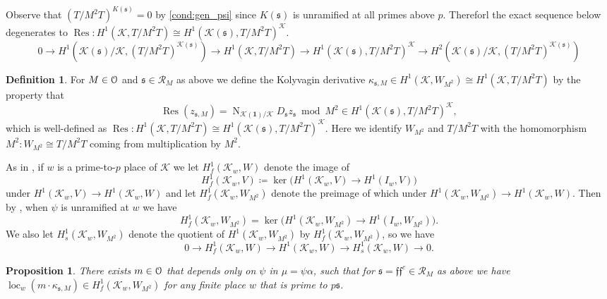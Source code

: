 \documentclass[leqno]{amsart}
\newtheorem{prop}[thm]{Proposition}
\theoremstyle{definition}
\newtheorem{defn}[thm]{Definition}
\theoremstyle{remark}
\newcommand{\id}{\mathbf{1}}
\newcommand{\eo}{\EuScript{O}}
\DeclareMathOperator{\Nr}{N}
\DeclareMathOperator{\Res}{Res}
\newcommand{\ff}{\mathfrak{f}}
\newcommand{\fs}{\mathfrak{s}}
\newcommand{\K}{{\mathcal{K}}} %
\DeclareMathOperator{\loc}{loc}
\begin{document}
Observe that $(T/{M^2}T)^{K(\fs)}=0$ by \eqref{cond:gen_psi}
since $K(\fs)$ is unramified at all primes above $p$. 
Thereforl the exact sequence below degenerates to 
$\Res\colon H^1(\K, T/{M^2}T)\cong H^1(\K(\fs), T/{M^2}T)^{\K}$.
\[
	0\to H^1(\K(\fs)/\K, (T/{M^2}T)^{\K(\fs)})\to
	H^1(\K, T/{M^2}T)\to
	H^1(\K(\fs), T/{M^2}T)^{\K}\to
	H^2(\K(\fs)/\K, (T/{M^2}T)^{\K(\fs)})
\]

\begin{defn}
For $M\in \eo$ and $\fs\in\mathcal{R}_M$ as above
we define the Kolyvagin derivative 
$\kappa_{\fs,M}\in H^1(\K,W_{M^2})\cong H^1(\K,T/{M^2}T)$
by the property that 
\[
    \Res(z_{\fs,M})=\Nr_{\K(\id)/\K}D_{\fs}z_{\fs} \bmod M^2\in 
    H^1(\K(\fs), T/{M^2}T)^{\K},
\]
which is well-defined as
$\Res\colon H^1(\K, T/{M^2}T)\cong H^1(\K(\fs), T/{M^2}T)^{\K}$.
Here we identify $W_{M^2}$ and $T/M^2T$ 
with the homomorphism $M^2\colon W_{M^2}\cong T/M^2T$
coming from multiplication by $M^2$.
\end{defn}


As in \cite[Def 1.3.4]{Rubin},
if $w$ is a prime-to-$p$ place of $\K$
we let $H^1_f(\K_w,W)$
denote the image of 
\[
    H^1_f(\K_w,V)\coloneqq
    \ker\big(H^1(\K_w,V)\to H^1(I_w, V)\big)
\]
under $H^1(\K_w,V)\to H^1(\K_w, W)$
and let $H^1_f(\K_w,W_{M^2})$ denote the preimage of which
under $H^1(\K_w,W_{M^2})\to H^1(\K_w, W)$. 
Then by \cite[Lem 1.3.8]{Rubin},
when $\psi$ is unramified at $w$ we have
\begin{equation}\label{eq:f_un}
    H^1_f(\K_w,W_{M^2})=
    \ker\big(H^1(\K_w,W_{M^2})\to H^1(I_w, W_{M^2})\big).
\end{equation}
We also let $H^1_s(\K_w,W_{M^2})$
denote the quotient of $H^1(\K_w,W_{M^2})$ by $H^1_f(\K_w,W_{M^2})$,
so we have 
\[
    0\to H^1_f(\K_w,W)\to H^1(\K_w,W)\to H^1_s(\K_w,W)\to 0.
\]




\begin{prop}\label{prop:goodm}
There exists $m\in \eo$
that depends only on $\psi$ in $\mu=\psi\alpha$, such that 
for $\fs=\ff\ff^c\in \mathcal{R}_M$ as above we have
$\loc_w(m\cdot \kappa_{\fs,M})\in H^1_f(\K_w,W_{M^2})$
for any finite place $w$ that is prime to $p\fs$.
\end{prop}
\end{document}
